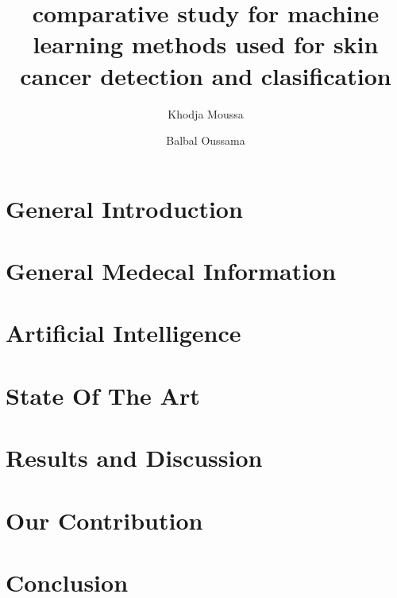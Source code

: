 \documentclass[12pt,a4paper]{report}
\title{comparative study for machine learning methods used for skin cancer detection and clasification}
\author{
	Khodja Moussa
	\and
	Balbal Oussama
}
\date{}
\begin{document}





\newpage


\newpage

\tableofcontents
\listoffigures
\listoftables
\newpage

\chapter{General Introduction}


\chapter{General Medecal Information}





\chapter{Artificial Intelligence}


\chapter{State Of The Art}


\chapter{Results and Discussion}


\chapter{Our Contribution}


\chapter{Conclusion}




\end{document}
